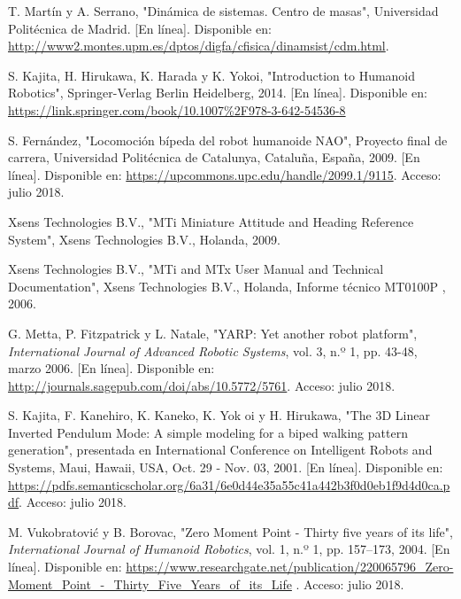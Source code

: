 \begin{thebibliography}{99}
 T. Martín y A. Serrano, "Dinámica de sistemas. Centro de masas", Universidad Politécnica de Madrid. [En línea]. Disponible en: \url{http://www2.montes.upm.es/dptos/digfa/cfisica/dinamsist/cdm.html}.

 S. Kajita, H. Hirukawa, K. Harada y K. Yokoi, "Introduction to Humanoid Robotics", Springer-Verlag Berlin Heidelberg, 2014. [En línea]. Disponible en: \url{https://link.springer.com/book/10.1007\%2F978-3-642-54536-8}


 S. Fernández, "Locomoción bípeda del robot humanoide NAO", Proyecto final de carrera, Universidad Politécnica de Catalunya, Cataluña, España, 2009. [En línea]. Disponible en: \url{https://upcommons.upc.edu/handle/2099.1/9115}. Acceso: julio 2018.

 Xsens Technologies B.V., "MTi Miniature Attitude and Heading Reference System", Xsens Technologies B.V., Holanda, 2009.

 Xsens Technologies B.V., "MTi and MTx User Manual and Technical Documentation", Xsens Technologies B.V., Holanda, Informe técnico MT0100P , 2006.

 G. Metta, P. Fitzpatrick y L. Natale, "YARP: Yet another robot platform", \textsl{International Journal of Advanced Robotic Systems}, vol. 3, n.º 1, pp. 43-48, marzo 2006. [En línea]. Disponible en: \url{http://journals.sagepub.com/doi/abs/10.5772/5761}. Acceso: julio 2018.

 S. Kajita, F. Kanehiro, K. Kaneko, K. Yok oi y H. Hirukawa, "The 3D Linear Inverted Pendulum Mode: A simple modeling for a biped walking pattern generation", presentada en International Conference on Intelligent Robots and Systems, Maui, Hawaii, USA, Oct. 29 - Nov. 03, 2001. [En línea]. Disponible en: \url{https://pdfs.semanticscholar.org/6a31/6e0d44e35a55c41a442b3f0d0eb1f9d4d0ca.pdf}. Acceso: julio 2018.

 M. Vukobratović y B. Borovac, "Zero Moment Point - Thirty five years of its life", \textit{International Journal of Humanoid Robotics}, vol. 1, n.º 1, pp. 157–173, 2004. [En línea]. Disponible en: \url{https://www.researchgate.net/publication/220065796_Zero-Moment_Point_-_Thirty_Five_Years_of_its_Life} . Acceso: julio 2018.


\end{thebibliography}
